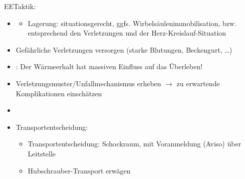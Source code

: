 \label{m:polytrauma}
EE{Taktik}: 


\begin{itemize}
  \item \TxMassVitMKBes
  \begin{itemize}
    \item Lagerung: situationsgerecht, ggfs.
    Wirbelsäulenimmobilisation, bzw. entsprechend den
    Verletzungen und der Herz-Kreislauf-Situation
  \end{itemize}
  \item Gefährliche Verletzungen versorgen (starke
  Blutungen, Beckengurt, \ldots) 
  \item {}: Der Wärmeerhalt hat massiven Einfluss auf das
  Überleben!
  \item Verletzungsmuster/Unfallmechanismus erheben $\rightarrow$ zu 
  erwartende Komplikationen einschätzen
  \item {}
  \item Transportentscheidung:
  \begin{itemize}
    \item Transportentscheidung: Schockraum, mit
    Voranmeldung (Aviso) über Leitstelle
    \item Hubschrauber-Transport erwägen
  \end{itemize}
\end{itemize}